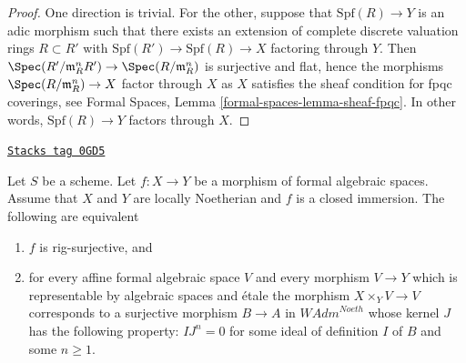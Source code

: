 \begin{proof}
One direction is trivial. For the other, suppose that $\text{Spf}(R) \to Y$
is an adic morphism such that there exists an extension of complete
discrete valuation rings $R \subset R'$ with
$\text{Spf}(R') \to \text{Spf}(R) \to X$ factoring through $Y$. Then
$\Spec(R'/\mathfrak m_R^n R') \to \Spec(R/\mathfrak m_R^n)$ is surjective
and flat, hence the morphisms $\Spec(R/\mathfrak m_R^n) \to X$ factor
through $X$ as $X$ satisfies the sheaf condition for fpqc coverings, see
Formal Spaces, Lemma \ref{formal-spaces-lemma-sheaf-fpqc}.
In other words, $\text{Spf}(R) \to Y$ factors through $X$.
\end{proof}

\begin{lemma}
\label{restricted-lemma-closed-immersion-rig-surjective}
\href{https://stacks.math.columbia.edu/tag/0GD5}{\texttt{Stacks tag 0GD5}}

Let $S$ be a scheme. Let $f : X \to Y$ be a morphism of formal algebraic
spaces. Assume that $X$ and $Y$ are locally Noetherian and $f$ is a
closed immersion. The following are equivalent
\begin{enumerate}
\item $f$ is rig-surjective, and
\item for every affine formal algebraic space $V$ and every morphism
$V \to Y$ which is representable by algebraic spaces and \'etale
the morphism $X \times_Y V \to V$ corresponds to a surjective morphism
$B \to A$ in $\textit{WAdm}^{Noeth}$ whose kernel $J$ has the following
property: $IJ^n = 0$ for some ideal of definition $I$ of $B$
and some $n \geq 1$.
\end{enumerate}
\end{lemma}

